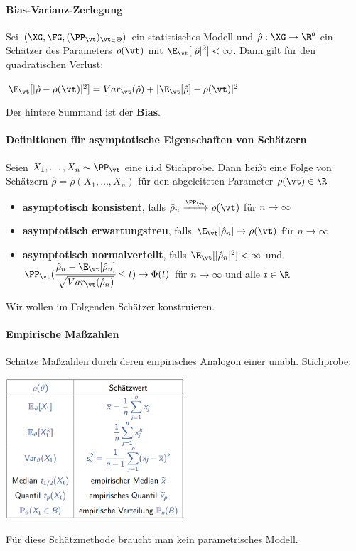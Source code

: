 \paragraph{Bias-Varianz-Zerlegung}
Sei $(\XG,\FG,(\PP_\vt)_{\vt\in\Theta})$ ein statistisches Modell und $\hat{\rho}:\XG\rightarrow\R^d$ ein Schätzer des Parameters $\rho(\vt)$ mit $\E_\vt[|\hat{\rho}|^2]<\infty$.
Dann gilt für den quadratischen Verlust:
\begin{tightcenter}
	$\E_\vt[|\hat{\rho}-\rho(\vt)|^2]=Var_\vt(\hat{\rho})+|\E_\vt[\hat{\rho}]-\rho(\vt)|^2$
\end{tightcenter}
Der hintere Summand ist der \textbf{Bias}.

\paragraph{Definitionen für asymptotische Eigenschaften von Schätzern}
Seien $X_1,\ldots,X_n\sim\PP_\vt$ eine i.i.d Stichprobe.
Dann heißt eine Folge von Schätzern $\hat{\rho}=\hat{\rho}(X_1,\ldots,X_n)$ für den abgeleiteten Parameter $\rho(\vt)\in\R$
\begin{itemize}
	\item \textbf{asymptotisch konsistent}, falls $\hat{\rho}_n\xrightarrow{\PP_\vt}\rho(\vt)$ für $n\rightarrow\infty$
	\item \textbf{asymptotisch erwartungstreu}, falls $\E_\vt[\hat{\rho}_n]\rightarrow\rho(\vt)$ für $n\rightarrow\infty$
	\item \textbf{asymptotisch normalverteilt}, falls $\E_\vt[|\hat{\rho}_n|^2]<\infty$ und
	$\PP_\vt(\cfrac{\hat{\rho}_n-\E_\vt[\hat{\rho}_n]}{\sqrt{Var_\vt(\hat{\rho}_n)}}\leq t)\rightarrow\Phi(t)$ für $n\rightarrow\infty$ und alle $t\in\R$
\end{itemize}

Wir wollen im Folgenden Schätzer konstruieren.

\paragraph{Empirische Maßzahlen}
Schätze Maßzahlen durch deren empirisches Analogon einer unabh. Stichprobe:
\begin{center}
	\includegraphics[width=0.5\textwidth]{images/image4.png}
\end{center}
Für diese Schätzmethode braucht man kein parametrisches Modell.

